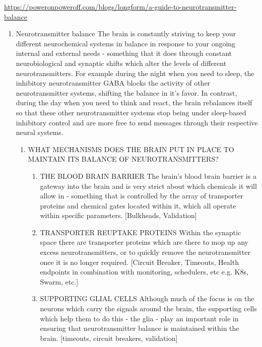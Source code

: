\documentclass[11pt]{article}
\begin{document}
\begin{enumerate}
\url{https://poweronpoweroff.com/blogs/longform/a-guide-to-neurotransmitter-balance}

\begin{enumerate}
\item Neurotransmitter balance
\label{sec:org44c3a9e}
The brain is constantly striving to keep your different neurochemical systems in balance in response to your ongoing internal and external needs - something that it does through constant neurobiological and synaptic shifts which
alter the levels of different neurotransmitters. For example during the night when you need to sleep, the inhibitory neurotransmitter GABA blocks the activity of other neurotransmitter systems, shifting the balance in it’s favor. In
contrast, during the day when you need to think and react, the brain rebalances itself so that these other neurotransmitter systems stop being under sleep-based inhibitory control and are more free to send messages through their
respective neural systems.

\begin{enumerate}
\item WHAT MECHANISMS DOES THE BRAIN PUT IN PLACE TO MAINTAIN ITS BALANCE OF NEUROTRANSMITTERS?
\label{sec:org55bb77e}
\begin{enumerate}
\item THE BLOOD BRAIN BARRIER
\label{sec:org2f55be4}
The brain's blood brain barrier is a gateway into the brain and is very strict about which chemicals it will allow in - something that is controlled by the array of transporter proteins and chemical gates located within it, which
all operate within specific parameters. [Bulkheads, Validation]

\item TRANSPORTER REUPTAKE PROTEINS
\label{sec:org90d88e4}
Within the synaptic space there are transporter proteins which are there to mop up any excess neurotransmitters, or to quickly remove the neurotransmitter once it is no longer required. [Circuit Breaker, Timeouts, Health endpoints
in combination with monitoring, schedulers, etc e.g. K8s, Swarm, etc.]

\item SUPPORTING GLIAL CELLS
\label{sec:org1141179}
Although much of the focus is on the neurons which carry the signals around the brain, the supporting cells which help them to do this - the glia - play an important role in ensuring that neurotransmitter balance is maintained
within the brain. [timeouts, circuit breakers, validation]


\end{enumerate}
\end{enumerate}
\end{enumerate}
\end{enumerate}
\end{document}
